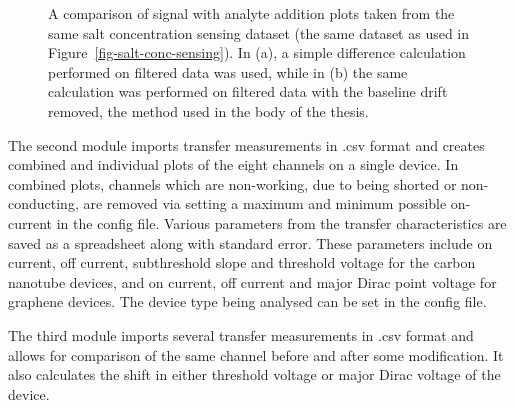 \documentclass[
  a4paper,
]{scrbook}
\begin{document}
\begin{figure}
\begin{minipage}[t]{0.50\linewidth}
{{}

}

\subcaption{\label{fig-spaa-detrend}}
\end{minipage}%

\caption{\label{fig-spaa-plot-comparison}A comparison of signal with
analyte addition plots taken from the same salt concentration sensing
dataset (the same dataset as used in
Figure~\ref{fig-salt-conc-sensing}). In (a), a simple difference
calculation performed on filtered data was used, while in (b) the same
calculation was performed on filtered data with the baseline drift
removed, the method used in the body of the thesis.}

\end{figure}

The second module imports transfer measurements in .csv format and
creates combined and individual plots of the eight channels on a single
device. In combined plots, channels which are non-working, due to being
shorted or non-conducting, are removed via setting a maximum and minimum
possible on-current in the config file. Various parameters from the
transfer characteristics are saved as a spreadsheet along with standard
error. These parameters include on current, off current, subthreshold
slope and threshold voltage for the carbon nanotube devices, and on
current, off current and major Dirac point voltage for graphene devices.
The device type being analysed can be set in the config file.

The third module imports several transfer measurements in .csv format
and allows for comparison of the same channel before and after some
modification. It also calculates the shift in either threshold voltage
or major Dirac voltage of the device.


\backmatter
\printbibliography
\end{document}
